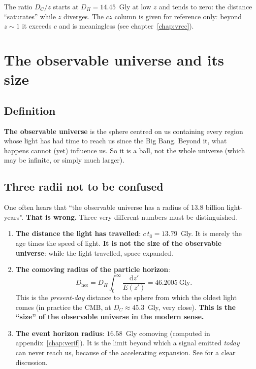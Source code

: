 \documentclass[11pt,a4paper,openany]{report}
\newcommand{\Gly}{\text{Gly}}
\newcommand{\dif}{\mathrm{d}}
\begin{document}
\noindent The ratio $D_C/z$ starts at $D_H = 14.45$~Gly at low $z$ and tends to
zero: the distance “saturates” while $z$ diverges. The $cz$ column is given
for reference only: beyond $z\sim 1$ it exceeds $c$ and is meaningless (see
chapter~\ref{chap:vrec}).

\chapter{The observable universe and its size}
\label{chap:observable}

\section{Definition}

\begin{tcolorbox}[plain]
\textbf{The observable universe} is the sphere centred on us containing every
region whose light has had time to reach us since the Big Bang. Beyond it, what
happens cannot (yet) influence us. So it is a ball, not the whole universe
(which may be infinite, or simply much larger).
\end{tcolorbox}

\section{Three radii not to be confused}

\begin{tcolorbox}[warning]
One often hears that “the observable universe has a radius of 13.8 billion
light-years”. \textbf{That is wrong.} Three very different numbers must be
distinguished.
\end{tcolorbox}

\begin{enumerate}
\item \textbf{The distance the light has travelled}: $c\,t_0 = 13.79$~Gly. It is
merely the age times the speed of light. \textbf{It is not the size of the
observable universe}: while the light travelled, space expanded.

\item \textbf{The comoving radius of the particle horizon}:
\[
D_{\text{hor}} = D_{H}\int_{0}^{\infty}\frac{\dif z'}{E(z')} = 46.2005~\Gly.
\]
This is the \emph{present-day} distance to the sphere from which the oldest
light comes (in practice the CMB, at $D_C \approx 45.3$~Gly, very close).
\textbf{This is the “size” of the observable universe in the modern sense.}

\item \textbf{The event horizon radius}: $16.58$~Gly comoving (computed in
appendix~\ref{chap:verif}). It is the limit beyond which a signal emitted
\emph{today} can never reach us, because of the accelerating expansion. See
\cite{Davis2004} for a clear discussion.
\end{enumerate}
\end{document}
